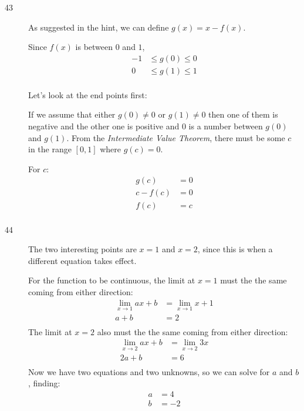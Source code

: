 \documentclass{exam}
\begin{document}
\ifprintanswers
\begin{description}
\item[43]
As suggested in the hint, we can define $g(x) = x - f(x)$.  

Since $f(x)$ is between $0$ and $1$, 
\begin{align*}
  -1 &\leq g(0) \leq 0 \\
  0  &\leq g(1) \leq 1  \\
\end{align*}

Let's look at the end points first:

If we assume that either $g(0) \neq 0$ or $g(1) \neq 0$ then one of them is negative and the other one is positive and 0
is a number between $g(0)$ and $g(1)$.  From the {\em Intermediate Value Theorem}, there must be some $c$ in the range
$[0, 1]$ where $g(c) = 0$.  

For $c$:
\begin{align*}
  g(c)     &= 0 \\
  c - f(c) &= 0 \\
  f(c)     &= c \\
\end{align*}

\item[44]

The two interesting points are $x = 1$ and $x = 2$, since this is when a different equation takes effect.  

For the function to be continuous, the limit at $x = 1$ must the the same coming from either direction:
\begin{align*}
  \lim_{x \to 1} ax + b &= \lim_{x \to 1} x + 1 \\
  a + b &= 2 \\
\end{align*}
The limit at $x = 2$ also must the the same coming from either direction:
\begin{align*}
  \lim_{x \to 2} ax + b &= \lim_{x \to 2} 3x \\
  2a + b &= 6 \\
\end{align*}
Now we have two equations and two unknowns, so we can solve for $a$ and $b$, finding:
\begin{align*}
  a &= 4 \\
  b &= -2 \\
\end{align*}

\end{description}
\end{document}

